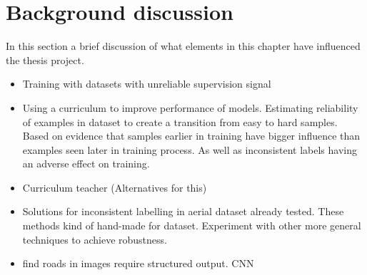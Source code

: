 \section{Background discussion}
\label{sec:backgroundDiscussion}
In this section a brief discussion of what elements in this chapter have influenced the thesis project.

\begin{itemize}
\item Training with datasets with unreliable supervision signal
\item Using a curriculum to improve performance of models. Estimating reliability of 
examples in dataset to create a transition from easy to hard samples. Based on 
evidence that samples earlier in training have bigger influence than examples seen later in training process. As well as inconsistent labels having an adverse effect on 
training.
\item Curriculum teacher (Alternatives for this)
\item Solutions for inconsistent labelling in aerial dataset already tested. These methods kind of hand-made  for dataset.
Experiment with other more general techniques to achieve robustness.
\item find roads in images require structured output. CNN 
\end{itemize}